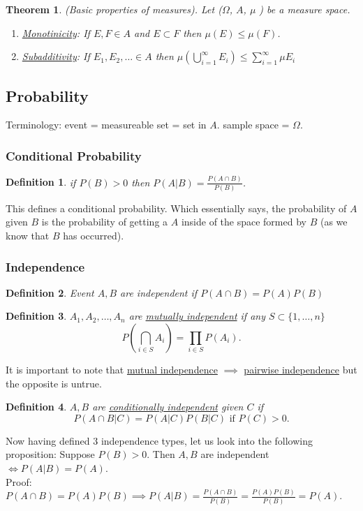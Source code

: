 \documentclass{article}
\newtheorem{theorem}{Theorem}
\newtheorem{definition}{Definition}
\begin{document}
\begin{theorem}
    (Basic properties of measures). Let ($\Omega$, $A$, $\mu$ ) be a measure space.
    \begin{enumerate}
        \item \underline{Monotinicity}: If $E,F \in A$ and $E \subset F$ then $\mu(E) \le \mu(F)$.
        \item \underline{Subadditivity}: If $E_1, E_2, \dots \in A$ then $\mu(\bigcup_{i=1}^{\infty} E_i) \le \sum_{i=1}^{\infty} \mu{E_i}$
    \end{enumerate}
\end{theorem}


\subsection{Probability}
Terminology: event = measureable set = set in $A$. 
             sample space = $\Omega$.

\subsubsection{Conditional Probability} 
\begin{definition}
    \label{def:conditional-probability}
    if $P(B) > 0$ then  $P(A | B) = \frac{P(A \cap B)}{P(B)}$.
\end{definition}
This defines a conditional probability. Which essentially says, the probability
of $A$ given $B$ is the probability of getting a $A$ inside of the space formed 
by $B$ (as we know that $B$ has occurred).

\subsubsection{Independence}
\begin{definition}
    \label{def:independence-probability}
    Event $A, B$ are independent if  $P(A \cap B) = P(A)P(B)$
\end{definition}

\begin{definition}
    \label{def:mutual-independence-probability}
$A_1, A_2, \dots, A_n$  are \underline{mutually independent} if any $S \subset \{1, \dots, n\}$
\[
    P(\bigcap_{i \in S} A_i) = \prod_{i \in S} P(A_i)  
.\] 
\end{definition}
It is important to note that \underline{mutual independence} $\implies$ 
\underline{pairwise independence} but the opposite is untrue. 
\begin{definition}
    \label{def:conditional-independent-probability}
    $A, B$ are \underline{conditionally independent} given  $C$ if 
    \[
        P(A \cap B | C) = P(A | C) P(B | C) \text{ if } P(C) > 0
    .\] 
\end{definition}
Now having defined 3 independence types, let us look into the following proposition:
Suppose $P(B) > 0$. Then  $A, B$ are independent  $\iff P(A|B) = P(A)$.\\
Proof: $P(A \cap B) = P(A)P(B) \implies P(A|B) = \frac{P(A \cap B)}{P(B)} = \frac{P(A)P(B)}{P(B)} = P(A)$.
\end{document}
